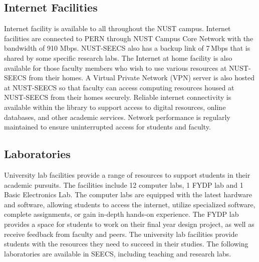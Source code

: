 


\hypertarget{internet-facilities}{%
\subsection{Internet Facilities}\label{internet-facilities}}

Internet facility is available to all throughout the NUST campus. Internet facilities
are connected to PERN through NUST Campus Core Network with the bandwidth of
910 Mbps. NUST-SEECS also has a backup link of 7\,Mbps that is shared by some
specific research labs. The Internet at home facility is also available for those
faculty members who wish to use various resources at NUST-SEECS from their homes.
A Virtual Private Network (VPN) server is also hosted at NUST-SEECS so that faculty
can access computing resources housed at NUST-SEECS from their homes securely.
Reliable internet connectivity is available within the library to support access to
digital resources, online databases, and other academic services. Network performance
is regularly maintained to ensure uninterrupted access for students and faculty.


\hypertarget{laboratories}{%
\subsection{Laboratories}\label{laboratories}}

University lab facilities provide a range of resources to support students in their
academic pursuits. The facilities include 12 computer labs, 1 FYDP lab and 1 Basic
Electronics Lab. The computer labs are equipped with the latest hardware and
software, allowing students to access the internet, utilize specialized software,
complete assignments, or gain in-depth hands-on experience. The FYDP lab provides a
space for students to work on their final year design project, as well as receive
feedback from faculty and peers. The university lab facilities provide students with
the resources they need to succeed in their studies. The following laboratories are
available in SEECS, including teaching and research labs.

